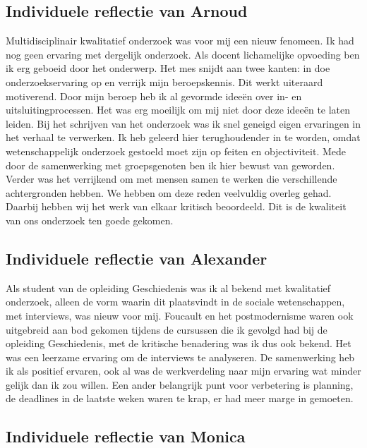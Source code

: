 \documentclass[a4paper,12pt]{memoir}
\begin{document}
\subsection{Individuele reflectie van Arnoud}

Multidisciplinair kwalitatief onderzoek was voor mij een nieuw fenomeen. Ik had nog geen ervaring met dergelijk onderzoek. Als docent lichamelijke opvoeding ben ik erg geboeid door het onderwerp. Het mes snijdt aan twee kanten: in doe onderzoekservaring op en verrijk mijn beroepskennis. Dit werkt uiteraard motiverend. Door mijn beroep heb ik al gevormde ideeën over in- en uitsluitingprocessen. Het was erg moeilijk om mij niet door deze ideeën te laten leiden. Bij het schrijven van het onderzoek was ik snel geneigd eigen ervaringen in het verhaal te verwerken. Ik heb geleerd hier terughoudender in te worden, omdat wetenschappelijk onderzoek gestoeld moet zijn op feiten en objectiviteit. Mede door de samenwerking met groepsgenoten ben ik hier bewust van geworden. Verder was het verrijkend om met mensen samen te werken die verschillende achtergronden hebben. We hebben om deze reden veelvuldig overleg gehad. Daarbij hebben wij het werk van elkaar kritisch beoordeeld. Dit is de kwaliteit van ons onderzoek ten goede gekomen.

\subsection{Individuele reflectie van Alexander}

Als student van de opleiding Geschiedenis was ik al bekend met kwalitatief onderzoek, alleen de vorm waarin dit plaatsvindt in de sociale wetenschappen, met interviews, was nieuw voor mij. Foucault en het postmodernisme waren ook uitgebreid aan bod gekomen tijdens de cursussen die ik gevolgd had bij de opleiding Geschiedenis, met de kritische benadering was ik dus ook bekend. Het was een leerzame ervaring om de interviews te analyseren. De samenwerking heb ik als positief ervaren, ook al was de werkverdeling naar mijn ervaring wat
minder gelijk dan ik zou willen. Een ander belangrijk punt voor verbetering is planning, de deadlines in de laatste weken waren te krap, er had meer marge in gemoeten.

\subsection{Individuele reflectie van Monica}
\end{document}
